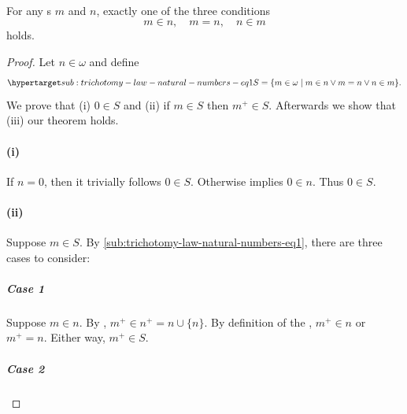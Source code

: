 \documentclass{report}
\begin{document}
\subsection{}%

  \begin{theorem}
    For any s $m$ and $n$, exactly one of the three
      conditions $$m \in n, \quad m = n, \quad n \in m$$ holds.
  \end{theorem}



  \begin{proof}

    Let $n \in \omega$ and define
      \begin{equation}
        \hyperlabel{sub:trichotomy-law-natural-numbers-eq1}
        S = \{m \in \omega \mid m \in n \lor m = n \lor n \in m\}.
      \end{equation}
    We prove that (i) $0 \in S$ and (ii) if $m \in S$ then $m^+ \in S$.
    Afterwards we show that (iii) our theorem holds.

    \paragraph{(i)}%

      If $n = 0$, then it trivially follows $0 \in S$.
      Otherwise  implies $0 \in n$.
      Thus $0 \in S$.

    \paragraph{(ii)}%

      Suppose $m \in S$.
      By \eqref{sub:trichotomy-law-natural-numbers-eq1}, there are three cases
        to consider:

      \subparagraph{Case 1}%

        Suppose $m \in n$.
        By , $m^+ \in n^+ = n \cup \{n\}$.
        By definition of the , $m^+ \in n$ or $m^+ = n$.
        Either way, $m^+ \in S$.

      \subparagraph{Case 2}%


\end{proof}
\end{document}
